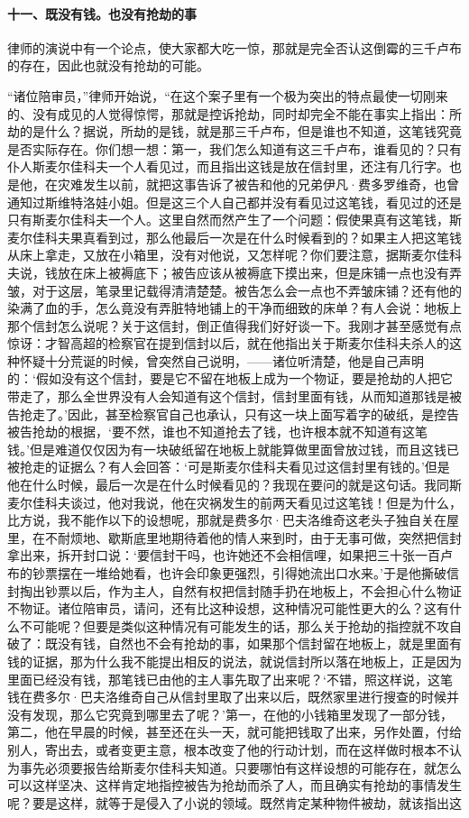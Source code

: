 \paragraph*{十一、既没有钱。也没有抢劫的事}
\par 律师的演说中有一个论点，使大家都大吃一惊，那就是完全否认这倒霉的三千卢布的存在，因此也就没有抢劫的可能。
\par “诸位陪审员，”律师开始说，“在这个案子里有一个极为突出的特点最使一切刚来的、没有成见的人觉得惊愕，那就是控诉抢劫，同时却完全不能在事实上指出：所劫的是什么？据说，所劫的是钱，就是那三千卢布，但是谁也不知道，这笔钱究竟是否实际存在。你们想一想：第一，我们怎么知道有这三千卢布，谁看见的？只有仆人斯麦尔佳科夫一个人看见过，而且指出这钱是放在信封里，还注有几行字。也是他，在灾难发生以前，就把这事告诉了被告和他的兄弟伊凡·费多罗维奇，也曾通知过斯维特洛娃小姐。但是这三个人自己都并没有看见过这笔钱，看见过的还是只有斯麦尔佳科夫一个人。这里自然而然产生了一个问题：假使果真有这笔钱，斯麦尔佳科夫果真看到过，那么他最后一次是在什么时候看到的？如果主人把这笔钱从床上拿走，又放在小箱里，没有对他说，又怎样呢？你们要注意，据斯麦尔佳科夫说，钱放在床上被褥底下；被告应该从被褥底下摸出来，但是床铺一点也没有弄皱，对于这层，笔录里记载得清清楚楚。被告怎么会一点也不弄皱床铺？还有他的染满了血的手，怎么竟没有弄脏特地铺上的干净而细致的床单？有人会说：地板上那个信封怎么说呢？关于这信封，倒正值得我们好好谈一下。我刚才甚至感觉有点惊讶：才智高超的检察官在提到信封以后，就在他指出关于斯麦尔佳科夫杀人的这种怀疑十分荒诞的时候，曾突然自己说明，——诸位听清楚，他是自己声明的：‘假如没有这个信封，要是它不留在地板上成为一个物证，要是抢劫的人把它带走了，那么全世界没有人会知道有这个信封，信封里面有钱，从而知道那钱是被告抢走了。’因此，甚至检察官自己也承认，只有这一块上面写着字的破纸，是控告被告抢劫的根据，‘要不然，谁也不知道抢去了钱，也许根本就不知道有这笔钱。’但是难道仅仅因为有一块破纸留在地板上就能算做里面曾放过钱，而且这钱已被抢走的证据么？有人会回答：‘可是斯麦尔佳科夫看见过这信封里有钱的。’但是他在什么时候，最后一次是在什么时候看见的？我现在要问的就是这句话。我同斯麦尔佳科夫谈过，他对我说，他在灾祸发生的前两天看见过这笔钱！但是为什么，比方说，我不能作以下的设想呢，那就是费多尔·巴夫洛维奇这老头子独自关在屋里，在不耐烦地、歇斯底里地期待着他的情人来到时，由于无事可做，突然把信封拿出来，拆开封口说：‘要信封干吗，也许她还不会相信哩，如果把三十张一百卢布的钞票摆在一堆给她看，也许会印象更强烈，引得她流出口水来。’于是他撕破信封掏出钞票以后，作为主人，自然有权把信封随手扔在地板上，不会担心什么物证不物证。诸位陪审员，请问，还有比这种设想，这种情况可能性更大的么？这有什么不可能呢？但要是类似这种情况有可能发生的话，那么关于抢劫的指控就不攻自破了：既没有钱，自然也不会有抢劫的事，如果那个信封留在地板上，就是里面有钱的证据，那为什么我不能提出相反的说法，就说信封所以落在地板上，正是因为里面已经没有钱，那笔钱已由他的主人事先取了出来呢？‘不错，照这样说，这笔钱在费多尔·巴夫洛维奇自己从信封里取了出来以后，既然家里进行搜查的时候并没有发现，那么它究竟到哪里去了呢？’第一，在他的小钱箱里发现了一部分钱，第二，他在早晨的时候，甚至还在头一天，就可能把钱取了出来，另作处置，付给别人，寄出去，或者变更主意，根本改变了他的行动计划，而在这样做时根本不认为事先必须要报告给斯麦尔佳科夫知道。只要哪怕有这样设想的可能存在，就怎么可以这样坚决、这样肯定地指控被告为抢劫而杀了人，而且确实有抢劫的事情发生呢？要是这样，就等于是侵入了小说的领域。既然肯定某种物件被劫，就该指出这